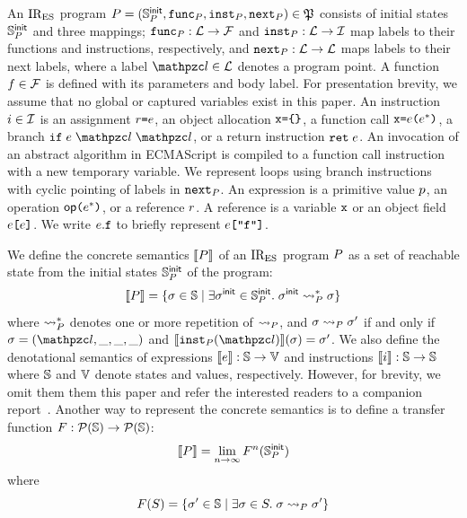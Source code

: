 An $\text{IR}_\text{ES}$ program $\prog = (\initstset{\prog}, \getfunc{\prog},
\getinst{\prog}, \getnext{\prog}) \in \progset $ consists of initial states
$\mathbb{S}^{\textsf{init}}_{P}$ and three mappings; $\getfunc{\prog}: \labset \rightarrow
\funcset$ and $\getinst{\prog}: \labset \rightarrow \instset$ map labels to
their functions and instructions, respectively, and $\getnext{\prog}: \labset
\rightarrow \labset$ maps labels to their next labels, where a label $\lab \in
\labset$ denotes a program point.  A function $f \in \mathcal{F}$ is defined
with its parameters and body label.  For presentation brevity, we assume that no
global or captured variables exist in this paper.  An instruction $i \in
\mathcal{I}$ is an assignment $\refer \kweq \expr$, an object allocation $\varx
\kweq \kwcl \kwcr$, a function call $\varx \kweq \expr \kwrl \expr^* \kwrr$, a
branch $\kwif \; \expr \; \lab \; \lab$, or a return instruction $\kwret \;
\expr$.  An invocation of an abstract algorithm in ECMAScript is compiled to a
function call instruction with a new temporary variable.  We represent loops
using branch instructions with cyclic pointing of labels in $\getnext{\prog}$.
An expression is a primitive value $p$, an operation $\op \kwrl \expr^*
\kwrr$, or a reference $r$.  A reference is a variable $\varx$ or an object
field $\expr \kwsl \expr \kwsr$.  We write $\expr.\varf$ to briefly represent
$\expr \kwsl \code{"f"} \kwsr$.

We define the concrete semantics $\llbracket{P}\rrbracket$ of an $\text{IR}_\text{ES}$ program $P$ as
a set of reachable state from the initial states $\mathbb{S}^{\textsf{init}}_{P}$ of the
program:
\[
  \llbracket{P}\rrbracket = \{ \sigma \in \mathbb{S} \mid \exists \sigma^{\textsf{init}} \in \mathbb{S}^{\textsf{init}}_{P}. \;
  \sigma^{\textsf{init}} \leadsto_{P}^* \sigma \}
\]
where $\leadsto_{P}^*$ denotes one or more repetition of $\leadsto_{P}$, and
$\sigma \leadsto_{P} \sigma'$ if and only if $\st = (\lab, \_, \_, \_)$ and
$\sem{\getinst{\prog}(\lab)}(\st) = \st'$.  We also define the denotational
semantics of expressions $\llbracket{e}\rrbracket: \mathbb{S} \rightarrow \mathbb{V}$ and
instructions $\llbracket{i}\rrbracket: \mathbb{S} \rightarrow \mathbb{S}$ where $\mathbb{S}$ and
$\mathbb{V}$ denote states and values, respectively.  However, for
brevity, we omit them them this paper and refer the interested readers to a
companion report~\cite{report}.  Another way to represent the concrete semantics
is to define a transfer function $F: \mathcal{P}(\mathbb{S}) \rightarrow
\mathcal{P}(\mathbb{S})$:
\[
  \llbracket{P}\rrbracket = \lim_{n \rightarrow \infty}F^n(\mathbb{S}^{\textsf{init}}_{P})
\]
where
\begin{equation}\label{eqn:transfer}
  \transfer(S) = \{ \st' \in \stset \mid \exists \st \in S. \; \st \trans{\prog}
  \st' \}
\end{equation}

